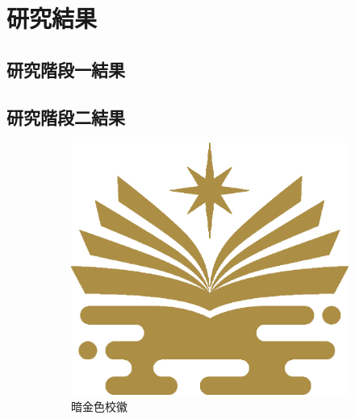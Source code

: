 \chapter{研究結果}

\section{研究階段一結果}
\section{研究階段二結果}

\begin{figure}
    \centering
    \begin{subfigure}{0.4\textwidth}
        \centering
        \includegraphics[width=\textwidth]{./figures/seal/seal_golden.png}
        \caption{暗金色校徽}
    \end{subfigure}
    \begin{subfigure}{0.4\textwidth}
        \centering

\end{subfigure}
\end{figure}
